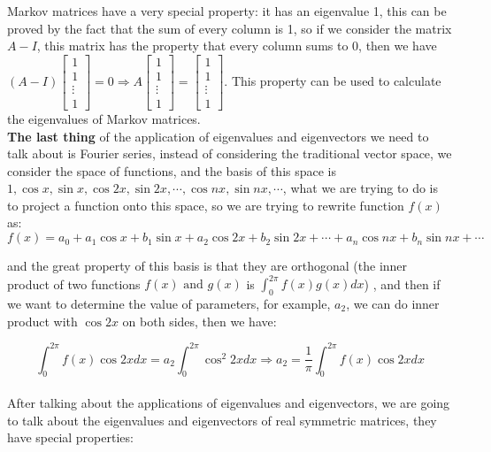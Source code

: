 \documentclass{article}
\begin{document}
Markov matrices have a very special property: it has an eigenvalue 1, this can be proved by the fact that the sum of every column is 1, so if we consider the matrix \( A - I \), this matrix has the property that every column sums to 0, then we have \( (A-I) \begin{bmatrix}
    1 \\
    1 \\
    \vdots \\
    1
\end{bmatrix} = 0 \Rightarrow A\begin{bmatrix}
    1 \\
    1 \\
    \vdots \\
    1
\end{bmatrix} = \begin{bmatrix}
    1 \\
    1 \\
    \vdots \\
    1
\end{bmatrix}\). This property can be used to calculate the eigenvalues of Markov matrices.
\\

\textbf{The last thing} of the application of eigenvalues and eigenvectors we need to talk about is Fourier series,
instead of considering the traditional vector space, we consider the space of functions, and the basis of this space is \( 1, \cos x, \sin x, \cos 2x, \sin 2x, 
\cdots, \cos nx, \sin nx, \cdots \), what we are trying to do is to project a function onto this space, so we are trying to rewrite function \( f(x) \) as:
\[
    f(x) = a_0 + a_1\cos x + b_1\sin x + a_2\cos 2x + b_2\sin 2x + \cdots + a_n\cos nx + b_n\sin nx + \cdots
\]

and the great property of this basis is that they are orthogonal (the inner product of two functions \( f(x) \text{ and } g(x) \) is \( \int_{0}^{2\pi} f(x)g(x)dx \))
, and then if we want to determine the value of parameters, for example, \( a_2 \), we can do inner product with \( \cos 2x \) on both sides, then we have:

\[
    \int_{0}^{2\pi} f(x)\cos 2x dx = a_2 \int_{0}^{2\pi} \cos^2 2x dx \Rightarrow a_2 = \frac{1}{\pi} \int_{0}^{2\pi} f(x) \cos 2x dx
\]
\\

After talking about the applications of eigenvalues and eigenvectors, we are going to talk about the eigenvalues and eigenvectors of real symmetric matrices, they have special properties:
\end{document}
